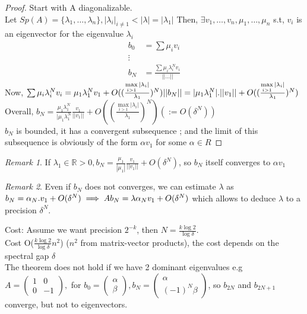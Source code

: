 \documentclass{article}
\theoremstyle{definition}
\theoremstyle{remark}
\newtheorem*{remark}{Remark}
\newcommand{\R}{\mathbb{R}}
\begin{document}
\begin{proof}
	Start with A diagonalizable.\\
	Let $Sp(A) = \{\lambda_1,\dots,\lambda_n\}, |\lambda_i|_{i\neq1} < |\lambda| = |\lambda_1|$
	Then, $\exists v_1,\dots,v_n,\mu_1,\dots,\mu_n$ s.t, $v_i$ is an eigenvector for the eigenvalue $\lambda_i$
	\begin{align*}
	b_0 & = \sum \mu_iv_i\\
	\vdots\\
	b_N & = \frac{\sum \mu_i \lambda_i^N v_i}{||\dots||}
	\end{align*}
	Now, $\sum \mu_i \lambda_i^N v_i = \mu_1 \lambda_1^N v_1 + O((\frac{\max\limits_{i > 1}|\lambda_i|}{\lambda_1})^N)
	\\
	||b_N|| = |\mu_1 \lambda_1^N|.||v_1|| + O((\frac{\max\limits_{i > 1}|\lambda_i|}{\lambda_1})^N)$\\
	Overall, $b_N = \frac{\mu_1 \lambda_1^N}{|\mu_1 \lambda_1^N} \frac{v_1}{||v_1||} + O((\frac{\max\limits_{i > 1}|\lambda_i|}{\lambda_1})^N) (:= O(\delta^N))$\\
	
	$b_N$ is bounded, it has a convergent subsequence ; and the limit of this subsequence is obviously of the form $\alpha v_1$ for some $\alpha \in R$
\end{proof}

\begin{remark}
	If $\lambda_1 \in \R > 0, b_N = \frac{\mu_1}{|\mu_1|} \frac{v_1}{||v_1||} + O(\delta^N)$, so $b_N$ itself converges to $\alpha v_1$
\end{remark}
\begin{remark}
	Even if $b_N$ does not converges, we can estimate $\lambda$ as $b_N = \alpha_N.v_1 + O(\delta^N)\\
	\implies A b_N = \lambda \alpha_N v_1 + O(\delta^N)$ which allows to deduce $\lambda$ to a precision $\delta^N$.
\end{remark}
Cost: Assume we want precision $2^{-k}$, then $N = \frac{k\log2}{\log\delta}$.\\
Cost O($\frac{k\log2}{\log\delta}n^2$) ($n^2$ from matrix-vector products), the cost depends on the spectral gap $\delta$\\

The theorem does not hold if we have 2 dominant eigenvalues e.g $A = \begin{pmatrix}
1&0\\0&-1
\end{pmatrix},$ for $b_0 = \begin{pmatrix}\alpha\\\beta\end{pmatrix}, b_N = \begin{pmatrix}
\alpha\\(-1)^N\beta
\end{pmatrix}$, so $b_{2N}$ and $b_{2N+1}$ converge, but not to eigenvectors.
\end{document}
